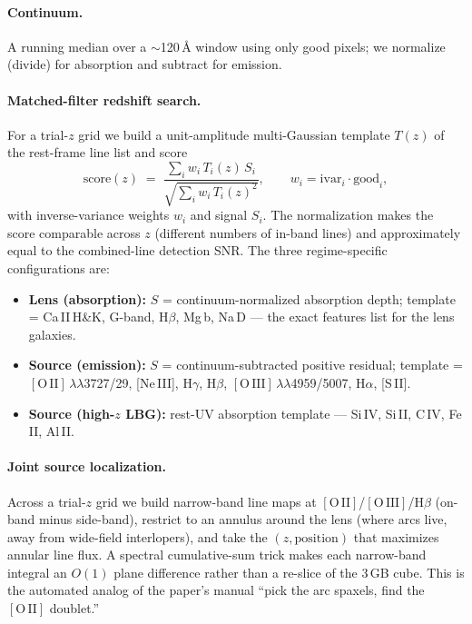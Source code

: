 \documentclass[11pt,letterpaper]{article}
\newcommand{\OII}{\ensuremath{[\mathrm{O\,II}]}}
\newcommand{\OIII}{\ensuremath{[\mathrm{O\,III}]}}
\begin{document}
\paragraph{Continuum.} A running median over a $\sim$120\,\AA{} window using only
good pixels; we normalize (divide) for absorption and subtract for emission.

\paragraph{Matched-filter redshift search.} For a trial-$z$ grid we build a
unit-amplitude multi-Gaussian template $T(z)$ of the rest-frame line list and
score
%
\begin{equation}
\mathrm{score}(z) \;=\;
   \frac{\sum_i w_i\, T_i(z)\, S_i}{\sqrt{\sum_i w_i\, T_i(z)^2}},
   \qquad w_i = \mathrm{ivar}_i \cdot \mathrm{good}_i,
\label{eq:xcorr}
\end{equation}
%
with inverse-variance weights $w_i$ and signal $S_i$. The normalization makes
the score comparable across $z$ (different numbers of in-band lines) and
approximately equal to the combined-line detection SNR. The three regime-specific
configurations are:
\begin{itemize}
\item \textbf{Lens (absorption):} $S$ = continuum-normalized absorption depth;
      template = Ca\,II\,H\&K, G-band, H$\beta$, Mg\,b, Na\,D --- the exact
      features \citet{lin2025foundry4} list for the lens galaxies.
\item \textbf{Source (emission):} $S$ = continuum-subtracted positive residual;
      template = \OII\,$\lambda\lambda$3727/29, [Ne\,III], H$\gamma$, H$\beta$,
      \OIII\,$\lambda\lambda$4959/5007, H$\alpha$, [S\,II].
\item \textbf{Source (high-$z$ LBG):} rest-UV absorption template ---
      Si\,IV, Si\,II, C\,IV, Fe\,II, Al\,II.
\end{itemize}

\paragraph{Joint source localization.} Across a trial-$z$ grid we build
narrow-band line maps at \OII/\OIII/H$\beta$ (on-band minus side-band),
restrict to an annulus around the lens (where arcs live, away from wide-field
interlopers), and take the $(z, \mathrm{position})$ that maximizes annular line
flux. A spectral cumulative-sum trick makes each narrow-band integral an $O(1)$
plane difference rather than a re-slice of the 3\,GB cube. This is the automated
analog of the paper's manual ``pick the arc spaxels, find the \OII{} doublet.''
\end{document}
